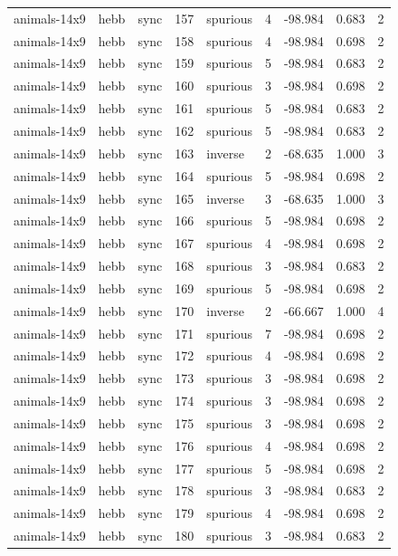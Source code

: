 \begin{tabular}{lllrlrrrr}
animals-14x9 & hebb & sync & 157 & spurious & 4 & -98.984 & 0.683 & 2 \\
animals-14x9 & hebb & sync & 158 & spurious & 4 & -98.984 & 0.698 & 2 \\
animals-14x9 & hebb & sync & 159 & spurious & 5 & -98.984 & 0.683 & 2 \\
animals-14x9 & hebb & sync & 160 & spurious & 3 & -98.984 & 0.698 & 2 \\
animals-14x9 & hebb & sync & 161 & spurious & 5 & -98.984 & 0.683 & 2 \\
animals-14x9 & hebb & sync & 162 & spurious & 5 & -98.984 & 0.683 & 2 \\
animals-14x9 & hebb & sync & 163 & inverse & 2 & -68.635 & 1.000 & 3 \\
animals-14x9 & hebb & sync & 164 & spurious & 5 & -98.984 & 0.698 & 2 \\
animals-14x9 & hebb & sync & 165 & inverse & 3 & -68.635 & 1.000 & 3 \\
animals-14x9 & hebb & sync & 166 & spurious & 5 & -98.984 & 0.698 & 2 \\
animals-14x9 & hebb & sync & 167 & spurious & 4 & -98.984 & 0.698 & 2 \\
animals-14x9 & hebb & sync & 168 & spurious & 3 & -98.984 & 0.683 & 2 \\
animals-14x9 & hebb & sync & 169 & spurious & 5 & -98.984 & 0.698 & 2 \\
animals-14x9 & hebb & sync & 170 & inverse & 2 & -66.667 & 1.000 & 4 \\
animals-14x9 & hebb & sync & 171 & spurious & 7 & -98.984 & 0.698 & 2 \\
animals-14x9 & hebb & sync & 172 & spurious & 4 & -98.984 & 0.698 & 2 \\
animals-14x9 & hebb & sync & 173 & spurious & 3 & -98.984 & 0.698 & 2 \\
animals-14x9 & hebb & sync & 174 & spurious & 3 & -98.984 & 0.698 & 2 \\
animals-14x9 & hebb & sync & 175 & spurious & 3 & -98.984 & 0.698 & 2 \\
animals-14x9 & hebb & sync & 176 & spurious & 4 & -98.984 & 0.698 & 2 \\
animals-14x9 & hebb & sync & 177 & spurious & 5 & -98.984 & 0.698 & 2 \\
animals-14x9 & hebb & sync & 178 & spurious & 3 & -98.984 & 0.683 & 2 \\
animals-14x9 & hebb & sync & 179 & spurious & 4 & -98.984 & 0.698 & 2 \\
animals-14x9 & hebb & sync & 180 & spurious & 3 & -98.984 & 0.683 & 2 \\

\end{tabular}
